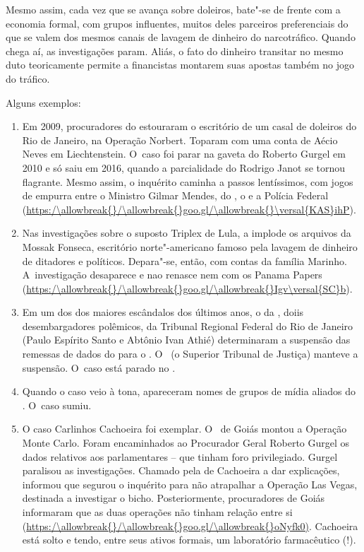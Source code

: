 Mesmo assim, cada vez que se avança sobre doleiros, bate"-se de frente
com a economia formal, com grupos influentes, muitos deles parceiros
preferenciais do  que se valem dos mesmos canais de lavagem de
dinheiro do narcotráfico. Quando chega aí, as investigações param.
Aliás, o fato do dinheiro transitar no mesmo duto teoricamente permite a
financistas montarem suas apostas também no jogo do tráfico.

Alguns exemplos:

\begin{enumerate}
\itemsep1pt\parskip0pt
\item
  Em 2009, procuradores do  estouraram o escritório de um casal de
  doleiros do Rio de Janeiro, na Operação Norbert. Toparam com uma conta
  de Aécio Neves em Liechtenstein. O~caso foi parar na gaveta do 
  Roberto Gurgel em 2010 e só saiu em 2016, quando a parcialidade do 
  Rodrigo Janot se tornou flagrante. Mesmo assim, o inquérito caminha a
  passos lentíssimos, com jogos de empurra entre o Ministro Gilmar
  Mendes, do , o  e a Polícia Federal
  (\url{https:/\allowbreak{}/\allowbreak{}goo.gl/\allowbreak{}\versal{KAS}ihP}).
\item
  Nas investigações sobre o suposto Triplex de Lula, a  implode os
  arquivos da Mossak Fonseca, escritório norte"-americano famoso pela
  lavagem de dinheiro de ditadores e políticos. Depara"-se, então, com
  contas da família Marinho. A~investigação desaparece e nao renasce nem
  com os Panama Papers (\url{https:/\allowbreak{}/\allowbreak{}goo.gl/\allowbreak{}Igv\versal{SC}b}).
\item
  Em um dos dos maiores escândalos dos últimos anos, o da , doiis
  desembargadores polêmicos, da Tribunal Regional Federal do Rio de
  Janeiro (Paulo Espírito Santo e Abtônio Ivan Athié) determinaram a
  suspensão das remessas de dados do  para o . O~ (o Superior
  Tribunal de Justiça) manteve a suspensão. O~caso está parado no .
\item
  Quando o caso  veio à tona, apareceram nomes de grupos de mídia
  aliados do . O~caso sumiu.
\item
  O caso Carlinhos Cachoeira foi exemplar. O~ de Goiás montou a
  Operação Monte Carlo. Foram encaminhados ao Procurador Geral Roberto
  Gurgel os dados relativos aos parlamentares -- que tinham foro
  privilegiado. Gurgel paralisou as investigações. Chamado pela  de
  Cachoeira a dar explicações, informou que segurou o inquérito para não
  atrapalhar a Operação Las Vegas, destinada a investigar o bicho.
  Posteriormente, procuradores de Goiás informaram que as duas operações
  não tinham relação entre si (\url{https:/\allowbreak{}/\allowbreak{}goo.gl/\allowbreak{}oNyfk0)}. Cachoeira
  está solto e tendo, entre seus ativos formais, um laboratório
  farmacêutico (!).
\end{enumerate}

